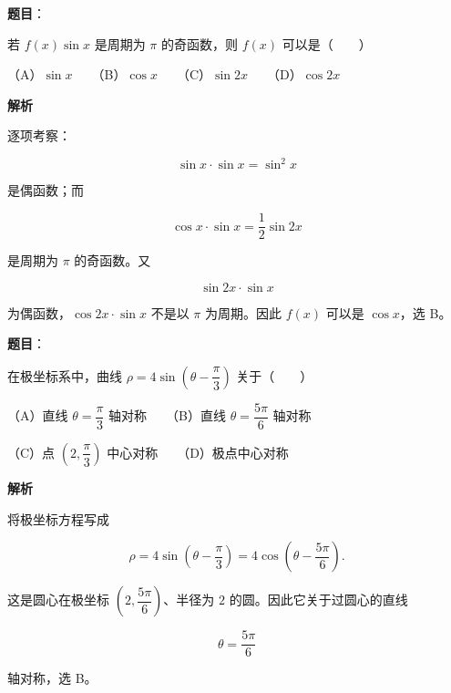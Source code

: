 \begin{answer}

\textbf{题目}：

若 $f(x)\sin x$ 是周期为 $\pi$ 的奇函数，则 $f(x)$ 可以是\mbox{（　　）}

（A）$\sin x$　　（B）$\cos x$　　（C）$\sin2x$　　（D）$\cos2x$

\textbf{解析}

逐项考察：

\nopagebreak[4]
\[
\sin x\cdot\sin x=\sin^2x
\]

是偶函数；而

\nopagebreak[4]
\[
\cos x\cdot\sin x=\frac12\sin2x
\]

是周期为 $\pi$ 的奇函数。又

\nopagebreak[4]
\[
\sin2x\cdot\sin x
\]

为偶函数，$\cos2x\cdot\sin x$ 不是以 $\pi$ 为周期。因此 $f(x)$ 可以是 $\cos x$，选 B。


\end{answer}
\begin{answer}

\textbf{题目}：

在极坐标系中，曲线 $\rho=4\sin\left(\theta-\dfrac\pi3\right)$ 关于\mbox{（　　）}

（A）直线 $\theta=\dfrac\pi3$ 轴对称　　（B）直线 $\theta=\dfrac{5\pi}6$ 轴对称

（C）点 $\left(2,\dfrac\pi3\right)$ 中心对称　　（D）极点中心对称

\textbf{解析}

将极坐标方程写成

\nopagebreak[4]
\[
\rho=4\sin\left(\theta-\frac\pi3\right)
=4\cos\left(\theta-\frac{5\pi}6\right).
\]

这是圆心在极坐标 $\left(2,\dfrac{5\pi}6\right)$、半径为 $2$ 的圆。因此它关于过圆心的直线

\nopagebreak[4]
\[
\theta=\frac{5\pi}6
\]

轴对称，选 B。


\end{answer}
